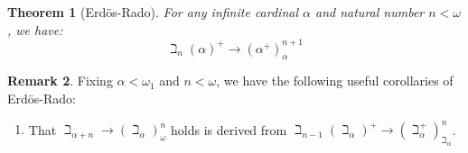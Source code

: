\documentclass{amsart}
\newtheorem{theorem}{Theorem}[section]
\theoremstyle{definition}
\newtheorem{remark}[theorem]{Remark}
\numberwithin{equation}{theorem}
\begin{document}
\begin{theorem}[Erd\"os-Rado]
  For any infinite cardinal $\alpha$ and natural number $n<\omega$, we have:
  \[
    \beth_n(\alpha)^+\rightarrow(\alpha^+)^{n+1}_\alpha
  \]
\end{theorem}
\begin{remark}\label{rem:erdos}
  Fixing $\alpha<\omega_1$ and $n<\omega$, we have the following useful corollaries of Erd\"os-Rado:
  \begin{enumerate}[label=({\ref{rem:erdos}}.\arabic*)]
  \item\label{itm:erdos-omega} That $\beth_{\alpha+n}\rightarrow(\beth_\alpha)^n_\omega$ holds is derived from $\beth_{n-1}(\beth_\alpha)^+\rightarrow(\beth_\alpha^+)^n_{\beth_\alpha}$.
  \end{enumerate}
\end{remark}
\end{document}
